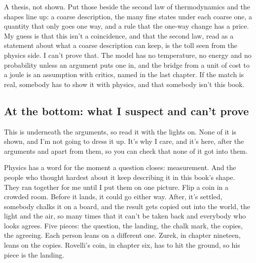 \documentclass[11pt,twoside]{article}
\theoremstyle{thielethm}
\theoremstyle{thieledef}
\theoremstyle{thieledef}
\theoremstyle{thieledef}
\theoremstyle{thielethm}
\theoremstyle{thieleobs}
\theoremstyle{thielethm}
\begin{document}
A thesis, not shown. Put those beside the second law of thermodynamics and the shapes line up: a coarse description, the many fine states under each coarse one, a quantity that only goes one way, and a rule that the one-way change has a price. My guess is that this isn't a coincidence, and that the second law, read as a statement about what a coarse description can keep, is the toll seen from the physics side. I can't prove that. The model has no temperature, no energy and no probability unless an argument puts one in, and the bridge from a unit of cost to a joule is an assumption with critics, named in the last chapter. If the match is real, somebody has to show it with physics, and that somebody isn't this book.

\subsection{At the bottom: what I suspect and can't prove}

This is underneath the arguments, so read it with the lights on. None of it is shown, and I'm not going to dress it up. It's why I care, and it's here, after the arguments and apart from them, so you can check that none of it got into them.

Physics has a word for the moment a question closes: measurement. And the people who thought hardest about it keep describing it in this book's shape. They ran together for me until I put them on one picture. Flip a coin in a crowded room. Before it lands, it could go either way. After, it's settled, somebody chalks it on a board, and the result gets copied out into the world, the light and the air, so many times that it can't be taken back and everybody who looks agrees. Five pieces: the question, the landing, the chalk mark, the copies, the agreeing. Each person leans on a different one. Zurek, in chapter nineteen, leans on the copies. Rovelli's coin, in chapter six, has to hit the ground, so his piece is the landing.
\end{document}
